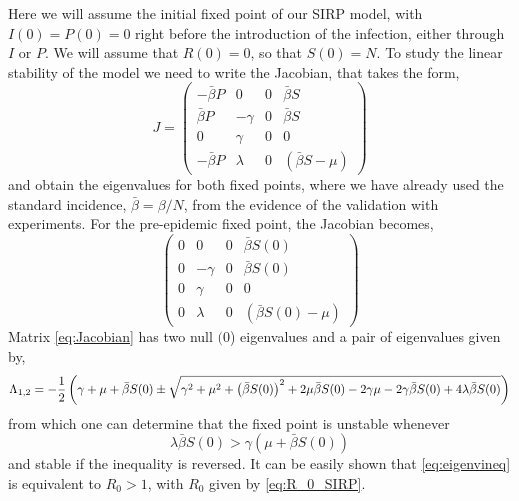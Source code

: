 Here we will assume the initial fixed point of our SIRP model, with
$I(0)=P(0)=0$ right before the introduction of the infection, either through
$I$ or $P$.
We will assume that $R(0)=0$, so that $S(0)=N$.
To study the linear stability of the model we need to write the Jacobian, that
takes the form,
\begin{equation}
    J=
    \begin{pmatrix}
        -\bar{\beta} P & 0       & 0 & \bar{\beta} S       \\
        \bar{\beta} P  & -\gamma & 0 & \bar{\beta} S       \\
        0              & \gamma  & 0 & 0                   \\
        -\bar{\beta} P & \lambda & 0 & (\bar{\beta} S-\mu)
    \end{pmatrix}
\end{equation}
and obtain the eigenvalues for both fixed points, where we have already used
the standard incidence, $\bar{\beta}=\beta/N$, from the evidence of the
validation with experiments.
For the pre-epidemic fixed point, the Jacobian becomes,
\begin{equation}
    \begin{pmatrix}
        0 & 0       & 0 & \bar{\beta} S(0)       \\
        0 & -\gamma & 0 & \bar{\beta} S(0)       \\
        0 & \gamma  & 0 & 0                      \\
        0 & \lambda & 0 & (\bar{\beta} S(0)-\mu)
    \end{pmatrix}
    \label{eq:Jacobian}
\end{equation}
Matrix \cref{eq:Jacobian} has two null $(0$) eigenvalues and a pair of
eigenvalues given by,
\begin{equation}
    \Lambda_{1,2}=-{1\over 2}\left(\gamma+\mu+{{\bar{\beta}
                S(0)}}\pm\sqrt{\gamma^2+\mu^2+\left({{\bar{\beta}
                    S(0)}}\right)^2
        +{{2\mu\bar{\beta} S(0)}}-2\gamma\mu
        -{{2\gamma\bar{\beta} S(0)}}+{{4\lambda\bar{\beta} S(0)}}}
    \right)
\end{equation}
from which one can determine that the fixed point is unstable whenever
\begin{equation}
    \lambda\bar{\beta} S(0)>\gamma(\mu+\bar{\beta} S(0))
    \label{eq:eigenvineq}
\end{equation}
and stable if the inequality is reversed.
It can be easily shown that \cref{eq:eigenvineq} is equivalent to $R_0>1$, with
$R_0$ given by \cref{eq:R_0_SIRP}.

